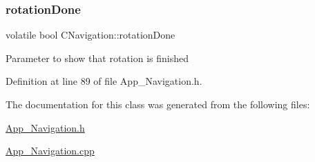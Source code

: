 \mbox{\label{class_c_navigation_a069e02947303fed95655cd4ad88a96b7}} 
\subsubsection{\texorpdfstring{rotation\+Done}{rotationDone}}
{\footnotesize\ttfamily volatile bool C\+Navigation\+::rotation\+Done}

Parameter to show that rotation is finished 

Definition at line 89 of file App\+\_\+\+Navigation.\+h.



The documentation for this class was generated from the following files\+:\begin{DoxyCompactItemize}
\item 
\mbox{\hyperlink{_app___navigation_8h}{App\+\_\+\+Navigation.\+h}}\item 
\mbox{\hyperlink{_app___navigation_8cpp}{App\+\_\+\+Navigation.\+cpp}}\end{DoxyCompactItemize}
